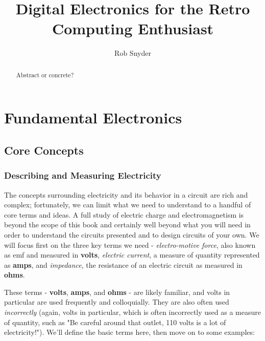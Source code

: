 \documentclass[10pt]{report}
\title{Digital Electronics for the Retro Computing Enthusiast}
\author{Rob Snyder}
\begin{document}
\maketitle

\begin{abstract}
Abstract or concrete?%
\end{abstract}

\tableofcontents

\part{Fundamental Electronics}
\chapter{Core Concepts}
\section{Describing  and Measuring Electricity}

The concepts surrounding electricity and its behavior in a circuit are rich and complex; fortunately, we can limit what we need to understand to a handful of core terms and ideas. A full study of electric charge and electromagnetism is beyond the scope of this book and certainly well beyond what you will need in order to understand the circuits presented and to design circuits of your own. We will focus first on the three key terms we need - \textit{electro-motive force}, also known as emf and measured in \textbf{volts}, \textit{electric current}, a measure of quantity represented as \textbf{amps}, and \textit{impedance}, the resistance of an electric circuit as measured in \textbf{ohms}.

These terms - \textbf{volts}, \textbf{amps}, and \textbf{ohms} - are likely familiar, and volts in particular are used frequently and colloquially. They are also often used \textit{incorrectly} (again, volts in particular, which is often incorrectly used as a measure of quantity, such as "Be careful around that outlet, 110 volts is a lot of electricity!"). We'll define the basic terms here, then move on to some examples:
\end{document}
